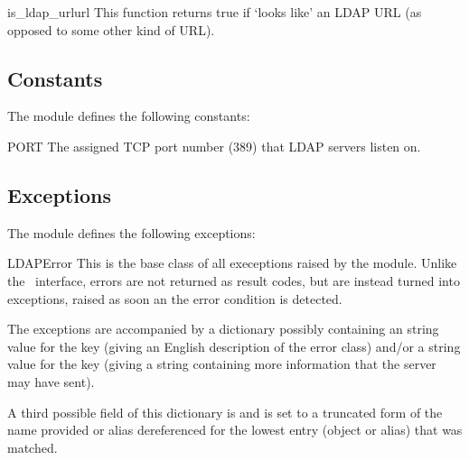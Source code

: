 \begin{funcdesc}{is_ldap_url}{url} %
  This function returns true if  `looks like' an LDAP URL 
  (as opposed to some other kind of URL). 
\end{funcdesc}



\subsection{Constants}

The module defines the following constants:

\begin{datadesc}{PORT}
  The assigned TCP port number (389) that LDAP servers listen on.
\end{datadesc}


\subsection{Exceptions}
\label{subsec:exceptfrommeth}

The module defines the following exceptions:

\begin{excdesc}{LDAPError}
This is the base class of all execeptions raised by the module.
Unlike the \C\ interface, errors are not returned as result codes, but
are instead turned into exceptions, raised as soon an the error condition 
is detected.

The exceptions are accompanied by a dictionary possibly
containing an string value for the key  
(giving an English description of the error class)
and/or a string value for the key 
(giving a string containing more information that the server may have sent).

A third possible field of this dictionary is  and
is set to a truncated form of the name provided or alias dereferenced
for the lowest entry (object or alias) that was matched.

\end{excdesc}

